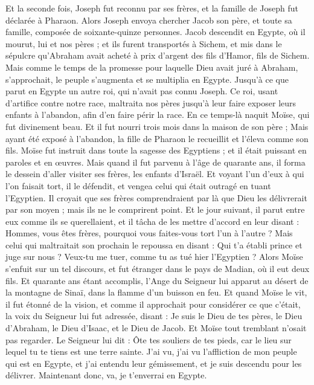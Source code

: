 \begin{multicols}{2}
{Et la seconde fois, Joseph fut reconnu par ses frères, et la famille de Joseph fut déclarée à Pharaon.
Alors Joseph envoya chercher Jacob son père, et toute sa famille, composée de soixante-quinze personnes.
Jacob descendit en Egypte, où il mourut, lui et nos pères ;
et ils furent transportés à Sichem, et mis dans le sépulcre qu'Abraham avait acheté à prix d'argent des fils d'Hamor, fils de Sichem.
Mais comme le temps de la promesse pour laquelle Dieu avait juré à Abraham, s'approchait, le peuple s'augmenta et se multiplia en Egypte.
Jusqu'à ce que parut en Egypte un autre roi, qui n'avait pas connu Joseph.
Ce roi, usant d'artifice contre notre race, maltraita nos pères jusqu'à leur faire exposer leurs enfants à l'abandon, afin d'en faire périr la race.
En ce temps-là naquit Moïse, qui fut divinement beau. Et il fut nourri trois mois dans la maison de son père ;
Mais ayant été exposé à l'abandon, la fille de Pharaon le recueillit et l'éleva comme son fils.
Moïse fut instruit dans toute la sagesse des Egyptiens ; et il était puissant en paroles et en œuvres.
Mais quand il fut parvenu à l'âge de quarante ans, il forma le dessein d'aller visiter ses frères, les enfants d'Israël.
Et voyant l'un d'eux à qui l'on faisait tort, il le défendit, et vengea celui qui était outragé en tuant l'Egyptien.
Il croyait que ses frères comprendraient par là que Dieu les délivrerait par son moyen ; mais ils ne le comprirent point.
Et le jour suivant, il parut entre eux comme ils se querellaient, et il tâcha de les mettre d'accord en leur disant : Hommes, vous êtes frères, pourquoi vous faites-vous tort l'un à l'autre ?
Mais celui qui maltraitait son prochain le repoussa en disant : Qui t'a établi prince et juge sur nous ?
Veux-tu me tuer, comme tu as tué hier l'Egyptien ?
Alors Moïse s'enfuit sur un tel discours, et fut étranger dans le pays de Madian, où il eut deux fils.
Et quarante ans étant accomplis, l'Ange du Seigneur lui apparut au désert de la montagne de Sinaï, dans la flamme d'un buisson en feu.
Et quand Moïse le vit, il fut étonné de la vision, et comme il approchait pour considérer ce que c'était, la voix du Seigneur lui fut adressée,
disant : Je suis le Dieu de tes pères, le Dieu d'Abraham, le Dieu d'Isaac, et le Dieu de Jacob. Et Moïse tout tremblant n'osait pas regarder.
Le Seigneur lui dit : Ôte tes souliers de tes pieds, car le lieu sur lequel tu te tiens est une terre sainte.
J'ai vu, j'ai vu l'affliction de mon peuple qui est en Egypte, et j'ai entendu leur gémissement, et je suis descendu pour les délivrer. Maintenant donc, va, je t'enverrai en Egypte.
}
\end{multicols}
